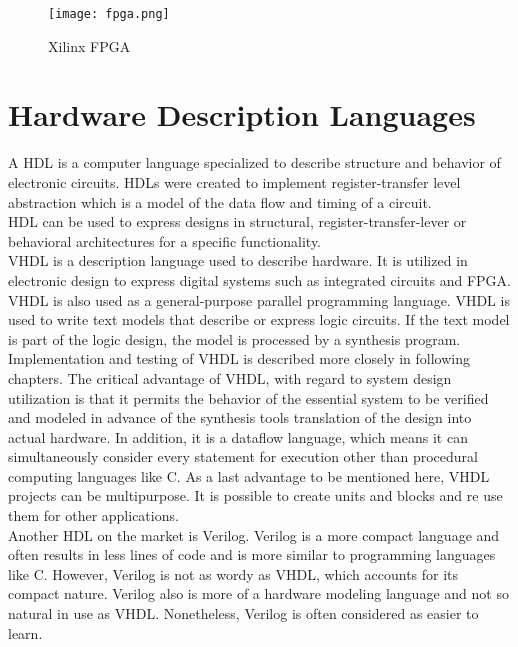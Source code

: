 \begin{figure}[h]
\centering
\texttt{[image: fpga.png]}
\caption{Xilinx FPGA \cite{xilinx:2017}}
\label{fig:FPGA}
\end{figure}
\section{Hardware Description Languages}
A \acf{HDL} is a computer language specialized to describe structure and behavior of electronic circuits. HDLs were created to implement register-transfer level abstraction which is a model of the data flow and timing of a circuit.\\
HDL can be used to express designs in structural, register-transfer-lever or behavioral architectures for a specific functionality.\\
VHDL is a description language used to describe hardware. It is utilized in electronic design to express digital systems such as integrated circuits and FPGA. VHDL is also used as a general-purpose parallel programming language. VHDL is used to write text models that describe or express logic circuits. If the text model is part of the logic design, the model is processed by a synthesis program. Implementation and testing of VHDL is described more closely in following chapters. The critical advantage of VHDL, with regard to system design utilization is that it permits the behavior of the essential system to be verified and modeled in advance of the synthesis tools translation of the design into actual hardware. In addition, it is a dataflow language, which means it can simultaneously consider every statement for execution other than procedural computing languages like C. As a last advantage to be mentioned here, VHDL projects can be multipurpose. It is possible to create units and blocks and re use them for other applications.\\
Another HDL on the market is Verilog. Verilog is a more compact language and often results in less lines of code and is more similar to programming languages like C. However, Verilog is not as wordy as VHDL, which accounts for its compact nature. Verilog also is more of a hardware modeling language and not so natural in use as VHDL. Nonetheless, Verilog is often considered as easier to learn. 



